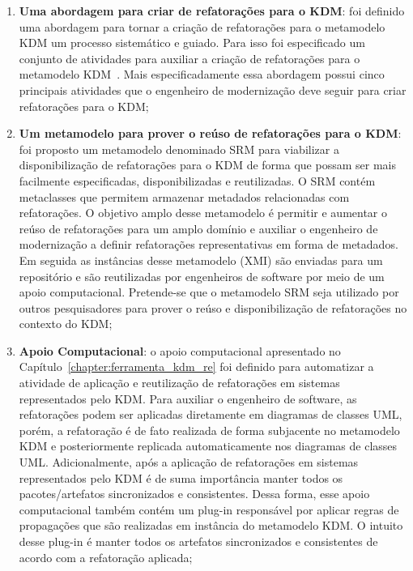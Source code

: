 \begin{enumerate}

\item \textbf{Uma abordagem para criar de refatorações para o KDM}: foi definido uma abordagem para tornar a criação de refatorações para o metamodelo KDM um processo sistemático e guiado. Para isso foi especificado um conjunto de atividades para auxiliar a criação de refatorações para o metamodelo KDM~\cite{durelli_catalogo}. Mais especificadamente essa abordagem possui cinco principais atividades que o engenheiro de modernização deve seguir para criar refatorações para o KDM;

\item \textbf{Um metamodelo para prover o reúso de refatorações para o KDM}: foi proposto um metamodelo denominado SRM para viabilizar a disponibilização de refatorações para o KDM de forma que possam ser mais facilmente especificadas, disponibilizadas e reutilizadas. O SRM contém metaclasses que permitem armazenar metadados relacionadas com refatorações. O objetivo amplo desse metamodelo é permitir e aumentar o reúso de refatorações para um amplo domínio e auxiliar o engenheiro de modernização a definir refatorações representativas em forma de metadados. Em seguida as instâncias desse metamodelo (XMI) são enviadas para um repositório e são reutilizadas por engenheiros de software por meio de um apoio computacional. Pretende-se que o metamodelo SRM seja utilizado por outros pesquisadores para prover o reúso e disponibilização de refatorações no contexto do KDM;

\item \textbf{Apoio Computacional}: o apoio computacional apresentado no Capítulo~\ref{chapter:ferramenta_kdm_re} foi definido para automatizar a atividade de aplicação e reutilização de refatorações em sistemas representados pelo KDM. Para auxiliar o engenheiro de software, as refatorações podem ser aplicadas diretamente em diagramas de classes UML, porém, a refatoração é de fato realizada de forma subjacente no metamodelo KDM e posteriormente replicada automaticamente nos diagramas de classes UML. Adicionalmente, após a aplicação de refatorações em sistemas representados pelo KDM é de suma importância manter todos os pacotes/artefatos sincronizados e consistentes. Dessa forma, esse apoio computacional também contém um plug-in responsável por aplicar regras de propagações que são realizadas em instância do metamodelo KDM. O intuito desse plug-in é manter todos os artefatos sincronizados e consistentes de acordo com a refatoração aplicada;


\end{enumerate}
